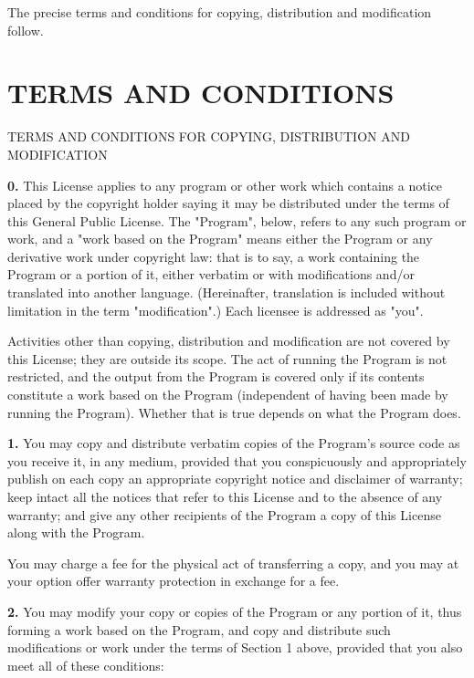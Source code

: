 The precise terms and conditions for copying, distribution and modification
follow. 

\section{TERMS AND CONDITIONS}
\label{SEC3}

TERMS AND CONDITIONS FOR COPYING, DISTRIBUTION AND MODIFICATION 

{\bf 0.} This License applies to any program or other work which contains a
notice placed by the copyright holder saying it may be distributed under the
terms of this General Public License. The "Program", below, refers to any
such program or work, and a "work based on the Program" means either the
Program or any derivative work under copyright law: that is to say, a work
containing the Program or a portion of it, either verbatim or with
modifications and/or translated into another language. (Hereinafter,
translation is included without limitation in the term "modification".) Each
licensee is addressed as "you". 

Activities other than copying, distribution and modification are not covered
by this License; they are outside its scope. The act of running the Program is
not restricted, and the output from the Program is covered only if its
contents constitute a work based on the Program (independent of having been
made by running the Program). Whether that is true depends on what the Program
does. 

{\bf 1.} You may copy and distribute verbatim copies of the Program's source
code as you receive it, in any medium, provided that you conspicuously and
appropriately publish on each copy an appropriate copyright notice and
disclaimer of warranty; keep intact all the notices that refer to this License
and to the absence of any warranty; and give any other recipients of the
Program a copy of this License along with the Program. 

You may charge a fee for the physical act of transferring a copy, and you may
at your option offer warranty protection in exchange for a fee. 

{\bf 2.} You may modify your copy or copies of the Program or any portion of
it, thus forming a work based on the Program, and copy and distribute such
modifications or work under the terms of Section 1 above, provided that you
also meet all of these conditions: 


